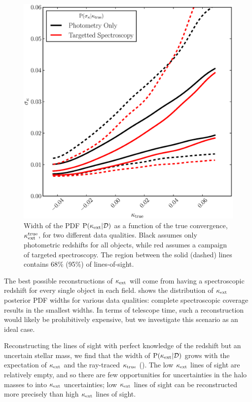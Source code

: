 \documentclass[useAMS,usenatbib,a4paper]{mn2e}
\begin{document}
\begin{figure}
\includegraphics[width=\columnwidth]{figs/WidthvsHilbert.eps}
\caption{Width of the \infered PDF ${\rm P}(\kappa_{\rm ext}|{\mathcal{D}})$ as a function of 
the true convergence, $\kappa_{\rm ext}^{\rm true}$, for two different data qualities. 
Black assumes only photometric redshifts for all objects,
while red assumes a campaign of targeted spectroscopy. The region between the
solid (dashed) lines contains 68\% (95\%) of lines-of-sight.}
\label{fig:widthsvsH}
\end{figure}

The best possible reconstructions of $\kappa_{\rm ext}$ will come from having a
spectroscopic redshift for every single object in each field.
 shows the distribution of $\kappa_{\rm ext}$ posterior 
PDF widths for various data qualities: complete spectroscopic coverage results
in the smallest widths. In terms of telescope time, such a reconstruction
would likely be prohibitively expensive, but we investigate this scenario as
an ideal case. 


Reconstructing the lines of sight with perfect knowledge of the
redshift but an uncertain stellar mass, we find that the width of
${\rm P}(\kappa_{\rm ext}|{\mathcal{D}})$ grows with the expectation of $\kappa_{\rm ext}$ and the ray-traced $\kappa_{\rm true}$
(). The low $\kappa_{\rm ext}$ lines of sight are relatively empty,
and so there are few opportunities for uncertainties in the halo masses to
\propogate into $\kappa_{\rm ext}$ uncertainties; low $\kappa_{\rm ext}$ lines of sight can be reconstructed
more precisely than high $\kappa_{\rm ext}$ lines of sight.
\end{document}
